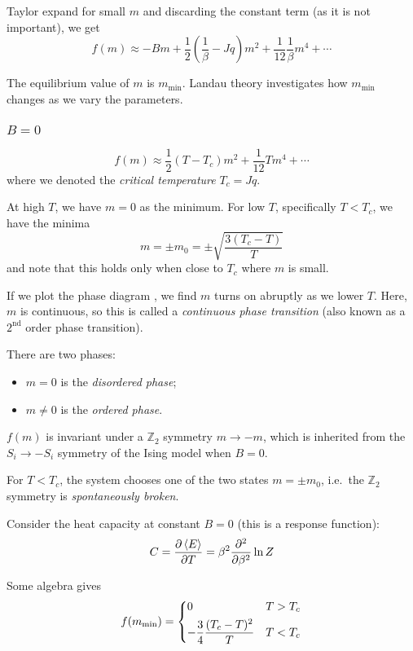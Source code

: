 \documentclass[a4paper,11pt]{article}
\begin{document}
	Taylor expand for small $m$ and discarding the constant term (as it is not important), we get
	\[
		f(m)\approx -Bm + \frac{1}{2} \left( \frac{1}{\beta} - J q \right) m^2 + \frac{1}{12} \frac{1}{\beta}m^4 + \cdots
	\]
	
	The equilibrium value of $m$ is $m_{\text{min}}$. Landau theory investigates how $m_{\text{min}}$ changes as we vary the parameters.

	\subsubsection{$B=0$}
	\[
		f(m) \approx \frac{1}{2} (T - T_c) m^2 + \frac{1}{12} T m^4 + \cdots
	\]
	where we denoted the \emph{critical temperature} $T_c = Jq$.


	At high $T$, we have $m=0$ as the minimum. For low $T$, specifically $T < T_c$, we have the minima
	\[
		m = \pm m_0 = \pm \sqrt{\frac{3(T_c - T)}{T}}
	\]
	and note that this holds only when close to $T_c$ where $m$ is small. 

	If we plot the phase diagram , we find $m$ turns on abruptly as we lower $T$. Here, $m$ is continuous, so this is called a \emph{continuous phase transition} (also known as a $2^{\text{nd}}$ order phase transition).

	There are two phases:
	\begin{itemize}
		\item $m=0$ is the \emph{disordered phase};
		\item $m \neq 0$ is the \emph{ordered phase}.
	\end{itemize}

	$f(m)$ is invariant under a $\mathbb{Z}_2$ symmetry $m \to -m$, which is inherited from the $S_i \to -S_i$ symmetry of the Ising model when $B = 0$.

	For $T < T_c$, the system chooses one of the two states $m = \pm m_0$, i.e.\ the $\mathbb{Z}_2$ symmetry is \emph{spontaneously broken}.

	Consider the heat capacity at constant $B = 0$ (this is a response function):
	\[
		C = \pdv{\expval{E}}{T} = \beta^2 \pdv[2]{\beta} \ln Z
	\]
	
	Some algebra gives
	\[
		f(m_{\text{min}}) = \begin{dcases}
			0 & T > T_c \\
			- \frac{3}{4} \frac{(T_c - T)^2}{T} & T<T_c
		\end{dcases}
	\]
	
\end{document}

